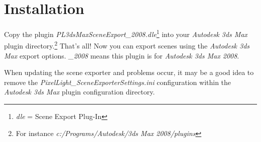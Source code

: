 \chapter{Installation}
Copy the plugin \emph{PL3dsMaxSceneExport\_2008.dle}\footnote{\emph{dle} = Scene Export Plug-In} into your \emph{Autodesk 3ds Max} plugin directory.\footnote{For instance \emph{c:/Programs/Autodesk/3ds Max 2008/plugins}} That's all! Now you can export scenes using the \emph{Autodesk 3ds Max} export options. \emph{\_2008} means this plugin is for \emph{Autodesk 3ds Max 2008}.

When updating the scene exporter and problems occur, it may be a good idea to remove the \emph{PixelLight\_SceneExporterSettings.ini} configuration within the \emph{Autodesk 3ds Max} plugin configuration directory.
